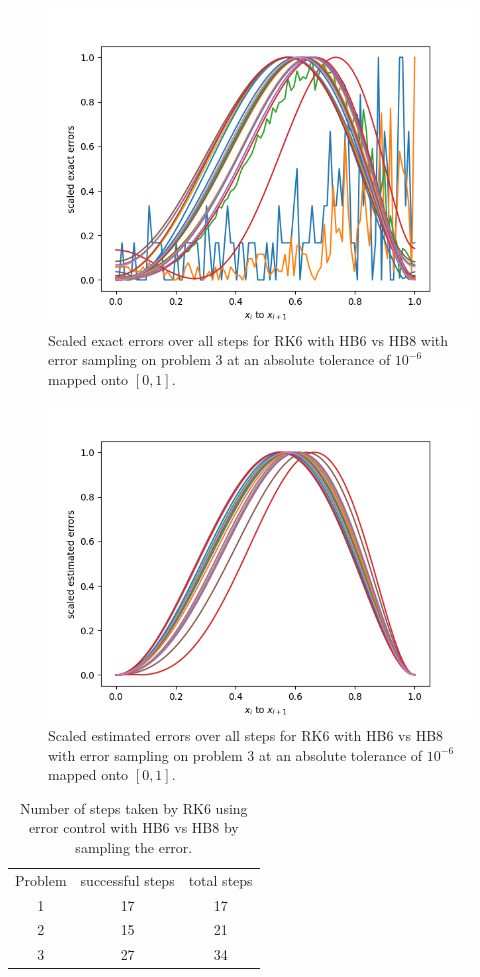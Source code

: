 \begin{figure}[H]
\centering
\includegraphics[width=0.7\linewidth]{./figures/rk6_with_hb6_hb8_sampling_p3_scaled_errors}
\caption{Scaled exact errors over all steps for RK6 with HB6 vs HB8 with error sampling on problem 3 at an absolute tolerance of $10^{-6}$ mapped onto $[0, 1]$.}
\label{fig:rk6_with_hb6_hb8_sampling_p3_scaled_errors}
\end{figure}

\begin{figure}[H]
\centering
\includegraphics[width=0.7\linewidth]{./figures/rk6_with_hb6_hb8_sampling_p3_scaled_estimated_errors}
\caption{Scaled estimated errors over all steps for RK6 with HB6 vs HB8 with error sampling on problem 3 at an absolute tolerance of $10^{-6}$ mapped onto $[0, 1]$.}
\label{fig:rk6_with_hb6_hb8_sampling_p3_scaled_estimated_errors}
\end{figure}

\begin{table}[h]
\caption {Number of steps taken by RK6 using error control with HB6 vs HB8 by sampling the error.} \label{tab:rk6_with_hb6_hb8_sampling_nsteps}
\begin{center}
\begin{tabular}{ c c c } 
Problem & successful steps & total steps \\ 
1       & 17                         & 17 \\ 
2       & 15                         & 21 \\
3       & 27                         & 34 \\
\end{tabular}
\end{center}
\end{table}


